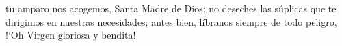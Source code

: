  tu amparo nos acogemos, Santa Madre de Dios; no deseches las súplicas que te dirigimos en nuestras necesidades;
antes bien, líbranos siempre de todo peligro, {!`}Oh Virgen gloriosa y bendita!